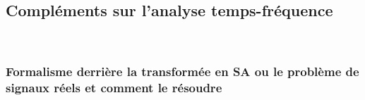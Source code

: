 
\subsection{Compléments sur l'analyse temps-fréquence} \label{ann:complement_t-f}

\\



\subsubsection{\wip Formalisme derrière la transformée en SA ou le problème de signaux réels et comment le résoudre} \label{sec:transfo_SA}

